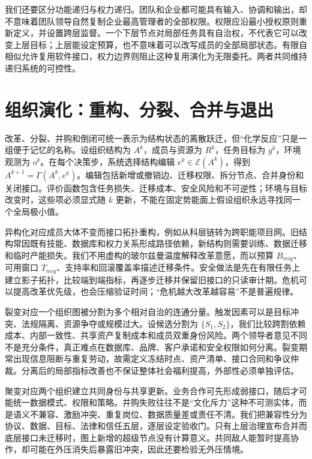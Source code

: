 我们还要区分功能递归与权力递归。团队和企业都可能具有输入、协调和输出，却不意味着团队领导自然复制企业最高管理者的全部权限。权限应沿最小授权原则重新定义，并设置跨层监督。一个下层节点对局部任务具有自治权，不代表它可以改变上层目标；上层能设定预算，也不意味着可以改写成员的全部局部状态。有限自相似允许复用软件接口，权力边界则阻止这种复用演化为无限委托。两者共同维持递归系统的可控性。

\section{组织演化：重构、分裂、合并与退出}
\label{sec:section_9449}

改革、分裂、并购和倒闭可统一表示为结构状态的离散跃迁，但“化学反应”只是一组便于记忆的名称。设组织结构为 $A^k$，成员与资源为 $R^k$，任务目标为 $g^k$，环境观测为 $o^k$。在每个决策步，系统选择结构编辑 $e^k\in\mathcal E(A^k)$，得到 $A^{k+1}=\Gamma(A^k,e^k)$。编辑包括新增或撤销边、迁移权限、拆分节点、合并身份和关闭接口。评价函数包含任务损失、迁移成本、安全风险和不可逆性；环境与目标改变时，这些项必须显式随 $k$ 更新，不能在固定势能面上假设组织永远寻找同一个全局极小值。

异构化对应成员大体不变而接口拓扑重构，例如从科层链转为跨职能项目网。旧结构常因既有技能、数据库和权力关系形成路径依赖，新结构则需要训练、数据迁移和临时产能损失。我们不用虚构的玻尔兹曼温度解释改革意愿，而以预算 $B_{mig}$、可用窗口 $T_{mig}$、支持率和回滚覆盖率描述迁移条件。安全做法是先在有限任务上建立影子拓扑，比较端到端指标，再逐步迁移并保留旧接口的只读审计期。危机可以提高改革优先级，也会压缩验证时间；“危机越大改革越容易”不是普遍规律。

裂变对应一个组织图被分割为多个相对自治的连通分量。触发因素可以是目标冲突、法规隔离、资源争夺或规模过大。设候选分割为 $\{S_1,S_2\}$，我们比较跨割依赖成本、内部一致性、共享资产复制成本和成员双重身份风险。两个领导者意见不同不是充分条件，真正难点在数据库、品牌、客户承诺和安全权限如何分离。裂变期常出现信息阻断与重复劳动，故需定义冻结时点、资产清单、接口合同和争议仲裁。分离后的局部指标改善也不保证整体社会福利提高，外部性必须单独评估。

聚变对应两个组织建立共同身份与共享更新。业务合作可先形成弱接口，随后才可能统一数据模式、权限和策略。并购失败往往不是“文化斥力”这种不可测实体，而是语义不兼容、激励冲突、重复岗位、数据质量差或责任不清。我们把兼容性分为协议、数据、目标、法律和信任五层，逐层设定验收门。只有上层治理宣布合并而底层接口未迁移时，图上新增的超级节点没有计算意义。共同敌人能暂时提高协作，却可能在外压消失后暴露旧冲突，因此还要检验无外压情境。

